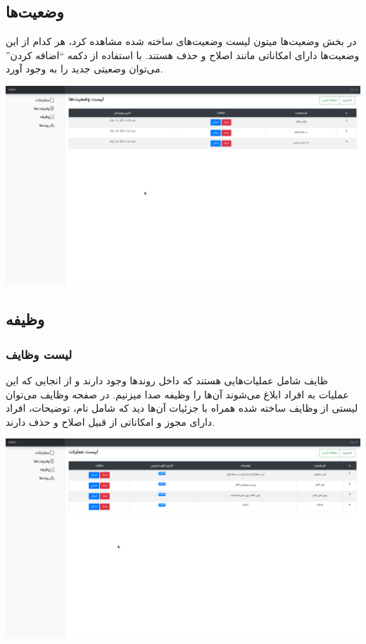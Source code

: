 \documentclass[a4paper]{article}
\begin{document}
\subsection{وضعیت‌ها}
\label{sec:org3f06379}
در بخش وضعیت‌ها میتون لیست وضعیت‌های ساخته شده مشاهده کرد، هر کدام از این وضعیت‌ها دارای امکاناتی مانند
اصلاح و حذف هستند. با استفاده از دکمه ``اضافه کردن'' می‌توان وضعیتی جدید را به وجود آورد.

\begin{center}
\includegraphics[width=.9\linewidth]{./img/Status.png}
\end{center}

\subsection{وظیفه}
\label{sec:org9d291af}
\subsubsection{لیست وظایف}
\label{sec:orga37dacf}
ظایف شامل عملیات‌هایی هستند که داخل روند‌ها وجود دارند و از انجایی که این عملیات به افراد ابلاغ می‌شوند آن‌ها را وظیفه صدا میزنیم.
در صفحه وظایف می‌توان لیستی از وظایف ساخته شده همراه با جزئیات آن‌ها دید که شامل نام، توضیحات، افراد دارای مجوز و امکاناتی از قبیل اصلاح و حذف دارند.

\begin{center}
\includegraphics[width=.9\linewidth]{./img/actions.png}
\end{center}
\end{document}
